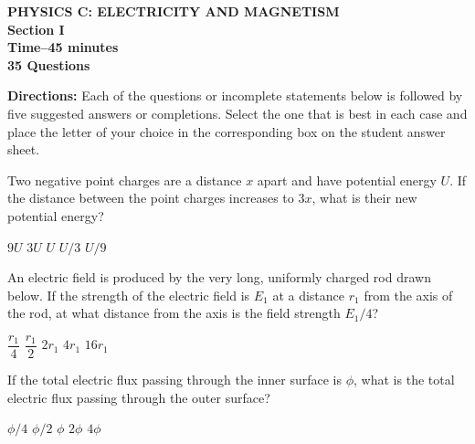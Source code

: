 \documentclass[12pt]{../oss-classkick-exam}
\begin{document}
\begin{center}
  \textbf{PHYSICS C: ELECTRICITY AND MAGNETISM\\
    Section I\\
    Time--45 minutes\\
    35 Questions
  }
\end{center}

\textbf{Directions:} Each of the questions or incomplete statements below is
followed by five suggested answers or completions. Select the one that is best
in each case and place the letter of your choice in the corresponding box on
the student answer sheet.

\begin{questions}
  \question Two negative point charges are a distance $x$ apart and have
  potential energy $U$. If the distance between the point charges increases to
  $3x$, what is their new potential energy?
  \begin{choices}
    \choice $9U$
    \choice $3U$
    \choice $U$
    \choice $U/3$
    \choice $U/9$
  \end{choices}

  
  \question An electric field is produced by the very long, uniformly charged
  rod drawn below. If the strength of the electric field is $E_1$ at a distance
  $r_1$ from the axis of the rod, at what distance from the axis is
  the field strength $E_1/4$?
  \begin{choices}
    \choice $\dfrac{r_1}4$
    \choice  $\dfrac{r_1}2$
    \choice $2r_1$
    \choice $4r_1$
    \choice $16r_1$
  \end{choices}
  

  \question If the total electric flux passing through the inner surface is
  $\phi$, what is the total electric flux passing through the outer surface?
  \begin{choices}
    \choice $\phi/4$
    \choice $\phi/2$
    \choice $\phi$
    \choice $2\phi$
    \choice $4\phi$
  \end{choices}
  \label{sphere1}
  

\end{questions}
\end{document}
